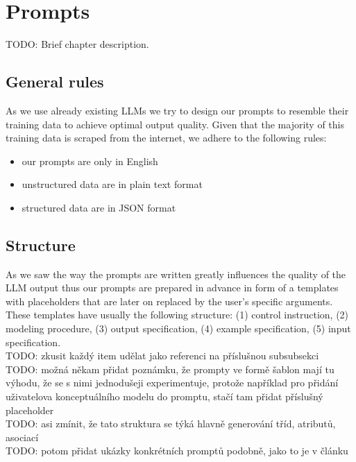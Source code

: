 \chapter{Prompts}

 
TODO: Brief chapter description.

\section{General rules}
As we use already existing LLMs we try to design our prompts to resemble their training data to achieve optimal output quality. Given that the majority of this training data is scraped from the internet, we adhere to the following rules:
\begin{itemize}
\item our prompts are only in English
\item unstructured data are in plain text format
\item structured data are in JSON format
\end{itemize}


\section{Structure}

As we saw the way the prompts are written greatly influences the quality of the LLM output thus our prompts are prepared in advance in form of a templates with placeholders that are later on replaced by the user's specific arguments. These templates have usually the following structure: (1) control instruction, (2) modeling procedure, (3) output specification, (4) example specification, (5) input specification. \\

TODO: zkusit každý item udělat jako referenci na příslušnou subsubsekci \\

TODO: možná někam přidat poznámku, že prompty ve formě šablon mají tu výhodu, že se s nimi jednodušeji experimentuje, protože například pro přidání uživatelova konceptuálního modelu do promptu, stačí tam přidat příslušný placeholder \\

TODO: asi zmínit, že tato struktura se týká hlavně generování tříd, atributů, asociací \\

TODO: potom přidat ukázky konkrétních promptů podobně, jako to je v článku \\


